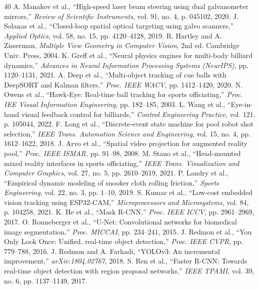 \documentclass[conference]{IEEEtran}
\begin{document}
\begin{thebibliography}{40}
 A. Manakov et al., ``High-speed laser beam steering using dual galvanometer mirrors,'' \textit{Review of Scientific Instruments}, vol. 91, no. 4, p. 045102, 2020.
 J. Solanas et al., ``Closed-loop spatial optical targeting using galvo scanners,'' \textit{Applied Optics}, vol. 58, no. 15, pp. 4120--4128, 2019.
 R. Hartley and A. Zisserman, \textit{Multiple View Geometry in Computer Vision}, 2nd ed. Cambridge Univ. Press, 2004.
 K. Greff et al., ``Neural physics engines for multi-body billiard dynamics,'' \textit{Advances in Neural Information Processing Systems (NeurIPS)}, pp. 1120--1131, 2021.
 A. Deep et al., ``Multi-object tracking of cue balls with DeepSORT and Kalman filters,'' \textit{Proc. IEEE WACV}, pp. 1412--1420, 2020.
 N. Owens et al., ``Hawk-Eye: Real-time ball tracking for sports officiating,'' \textit{Proc. IEE Visual Information Engineering}, pp. 182--185, 2003.
 L. Wang et al., ``Eye-in-hand visual feedback control for billiards,'' \textit{Control Engineering Practice}, vol. 121, p. 105044, 2022.
 F. Long et al., ``Discrete-event state machine for pool robot shot selection,'' \textit{IEEE Trans. Automation Science and Engineering}, vol. 15, no. 4, pp. 1612--1622, 2018.
 J. Arvo et al., ``Spatial video projection for augmented reality pool,'' \textit{Proc. IEEE ISMAR}, pp. 91--98, 2008.
 M. Stano et al., ``Head-mounted mixed reality interfaces in sports officiating,'' \textit{IEEE Trans. Visualization and Computer Graphics}, vol. 27, no. 5, pp. 2610--2619, 2021.
 P. Landry et al., ``Empirical dynamic modeling of snooker cloth rolling friction,'' \textit{Sports Engineering}, vol. 22, no. 3, pp. 1--10, 2019.
 S. Kumar et al., ``Low-cost embedded vision tracking using ESP32-CAM,'' \textit{Microprocessors and Microsystems}, vol. 84, p. 104258, 2021.
 K. He et al., ``Mask R-CNN,'' \textit{Proc. IEEE ICCV}, pp. 2961--2969, 2017.
 O. Ronneberger et al., ``U-Net: Convolutional networks for biomedical image segmentation,'' \textit{Proc. MICCAI}, pp. 234--241, 2015.
 J. Redmon et al., ``You Only Look Once: Unified, real-time object detection,'' \textit{Proc. IEEE CVPR}, pp. 779--788, 2016.
 J. Redmon and A. Farhadi, ``YOLOv3: An incremental improvement,'' \textit{arXiv:1804.02767}, 2018.
 S. Ren et al., ``Faster R-CNN: Towards real-time object detection with region proposal networks,'' \textit{IEEE TPAMI}, vol. 39, no. 6, pp. 1137--1149, 2017.

\end{thebibliography}
\end{document}
